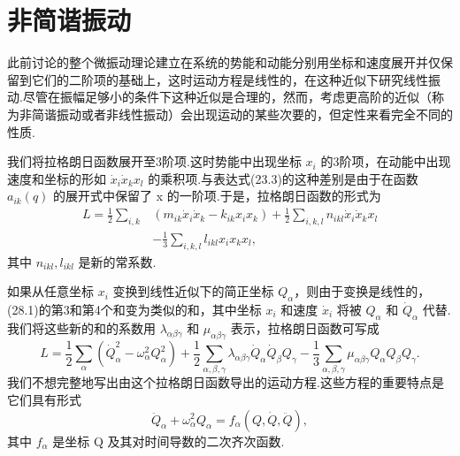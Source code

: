 \section{非简谐振动}

此前讨论的整个微振动理论建立在系统的势能和动能分别用坐标和速度展开并仅保留到它们的二阶项的基础上，这时运动方程是线性的，在这种近似下研究线性振动.尽管在振幅足够小的条件下这种近似是合理的，然而，考虑更高阶的近似（称为非简谐振动或者非线性振动）会出现运动的某些次要的，但定性来看完全不同的性质.

我们将拉格朗日函数展开至3阶项.这时势能中出现坐标 $x_i$ 的3阶项，在动能中出现速度和坐标的形如 $\dot{x}_i\dot{x}_kx_l$ 的乘积项.与表达式(23.3)的这种差别是由于在函数 $a_{ik}(q)$ 的展开式中保留了 x 的一阶项.于是，拉格朗日函数的形式为
\begin{equation}
\begin{aligned}
  L=\frac{1}{2}\sum_{i,k}&\left(m_{ik}\dot{x}_i\dot{x}_k-k_{ik}x_ix_k\right)
  +\frac{1}{2}\sum_{i,k,l}n_{ikl}\dot{x}_i\dot{x}_kx_l\\
  &-\frac{1}{3}\sum_{i,k,l}l_{ikl}x_ix_kx_l,
\end{aligned}
\end{equation}
其中 $n_{ikl},l_{ikl}$ 是新的常系数.

如果从任意坐标 $x_i$ 变换到线性近似下的简正坐标 $Q_\alpha$，则由于变换是线性的，(28.1)的第3和第4个和变为类似的和，其中坐标 $x_i$ 和速度 $\dot{x}_i$ 将被 $Q_\alpha$ 和 $\dot{Q}_\alpha$ 代替.我们将这些新的和的系数用 $\lambda_{\alpha\beta\gamma}$ 和 $\mu_{\alpha\beta\gamma}$ 表示，拉格朗日函数可写成
\begin{equation}
  L=\frac{1}{2}\sum_\alpha\left(\dot{Q}_\alpha^2-\omega_\alpha^2Q_\alpha^2\right)
  +\frac{1}{2}\sum_{\alpha,\beta,\gamma}\lambda_{\alpha\beta\gamma}\dot{Q}_\alpha\dot{Q}_\beta Q_\gamma
  -\frac{1}{3}\sum_{\alpha,\beta,\gamma}\mu_{\alpha\beta\gamma}Q_\alpha Q_\beta Q_\gamma.
\end{equation}
我们不想完整地写出由这个拉格朗日函数导出的运动方程.这些方程的重要特点是它们具有形式
\begin{equation}
  \ddot{Q}_\alpha+\omega_\alpha^2Q_\alpha=f_\alpha(Q,\dot{Q},\ddot{Q}),
\end{equation}
其中 $f_\alpha$ 是坐标 Q 及其对时间导数的二次齐次函数.

